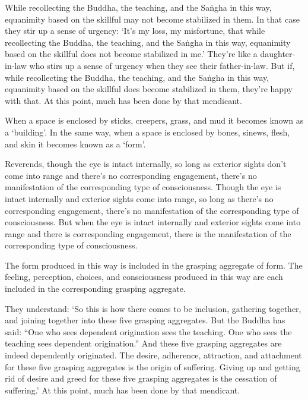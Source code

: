 \documentclass[12pt,openany]{book}%
\begin{document}
While recollecting the Buddha, the teaching, and the \textsanskrit{Saṅgha} in this way, equanimity based on the skillful may not become stabilized in them. In that case they stir up a sense of urgency: ‘It’s my loss, my misfortune, that while recollecting the Buddha, the teaching, and the \textsanskrit{Saṅgha} in this way, equanimity based on the skillful does not become stabilized in me.’ They’re like a daughter-in-law who stirs up a sense of urgency when they see their father-in-law. But if, while recollecting the Buddha, the teaching, and the \textsanskrit{Saṅgha} in this way, equanimity based on the skillful does become stabilized in them, they’re happy with that. At this point, much has been done by that mendicant. 

When a space is enclosed by sticks, creepers, grass, and mud it becomes known as a ‘building’. In the same way, when a space is enclosed by bones, sinews, flesh, and skin it becomes known as a ‘form’. 

Reverends, though the eye is intact internally, so long as exterior sights don’t come into range and there’s no corresponding engagement, there’s no manifestation of the corresponding type of consciousness. Though the eye is intact internally and exterior sights come into range, so long as there’s no corresponding engagement, there’s no manifestation of the corresponding type of consciousness. But when the eye is intact internally and exterior sights come into range and there is corresponding engagement, there is the manifestation of the corresponding type of consciousness. 

The form produced in this way is included in the grasping aggregate of form. The feeling, perception, choices, and consciousness produced in this way are each included in the corresponding grasping aggregate. 

They understand: ‘So this is how there comes to be inclusion, gathering together, and joining together into these five grasping aggregates. But the Buddha has said: “One who sees dependent origination sees the teaching. One who sees the teaching sees dependent origination.” And these five grasping aggregates are indeed dependently originated. The desire, adherence, attraction, and attachment for these five grasping aggregates is the origin of suffering. Giving up and getting rid of desire and greed for these five grasping aggregates is the cessation of suffering.’ At this point, much has been done by that mendicant. 
\end{document}
